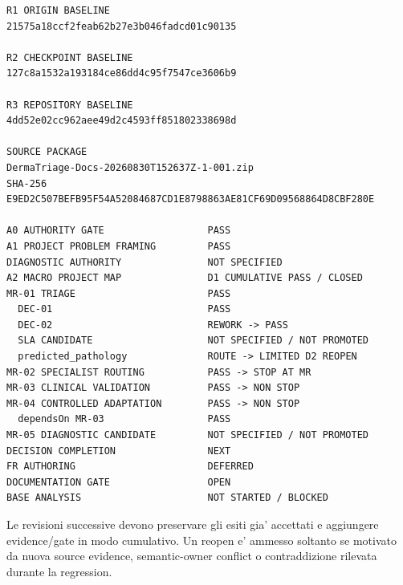 \documentclass[11pt,a4paper]{article}
\begin{document}
\begin{lstlisting}
R1 ORIGIN BASELINE
21575a18ccf2feab62b27e3b046fadcd01c90135

R2 CHECKPOINT BASELINE
127c8a1532a193184ce86dd4c95f7547ce3606b9

R3 REPOSITORY BASELINE
4dd52e02cc962aee49d2c4593ff851802338698d

SOURCE PACKAGE
DermaTriage-Docs-20260830T152637Z-1-001.zip
SHA-256
E9ED2C507BEFB95F54A52084687CD1E8798863AE81CF69D09568864D8CBF280E

A0 AUTHORITY GATE                  PASS
A1 PROJECT PROBLEM FRAMING         PASS
DIAGNOSTIC AUTHORITY               NOT SPECIFIED
A2 MACRO PROJECT MAP               D1 CUMULATIVE PASS / CLOSED
MR-01 TRIAGE                       PASS
  DEC-01                           PASS
  DEC-02                           REWORK -> PASS
  SLA CANDIDATE                    NOT SPECIFIED / NOT PROMOTED
  predicted_pathology              ROUTE -> LIMITED D2 REOPEN
MR-02 SPECIALIST ROUTING           PASS -> STOP AT MR
MR-03 CLINICAL VALIDATION          PASS -> NON STOP
MR-04 CONTROLLED ADAPTATION        PASS -> NON STOP
  dependsOn MR-03                  PASS
MR-05 DIAGNOSTIC CANDIDATE         NOT SPECIFIED / NOT PROMOTED
DECISION COMPLETION                NEXT
FR AUTHORING                       DEFERRED
DOCUMENTATION GATE                 OPEN
BASE ANALYSIS                      NOT STARTED / BLOCKED
\end{lstlisting}

\begin{ddtacore}[title={Continuation invariant}]
Le revisioni successive devono preservare gli esiti gia' accettati e aggiungere evidence/gate in modo cumulativo. Un reopen e' ammesso soltanto se motivato da nuova source evidence, semantic-owner conflict o contraddizione rilevata durante la regression.
\end{ddtacore}
\end{document}
